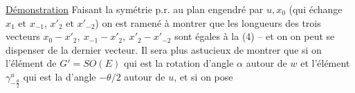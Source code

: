 \uline{Démonstration} Faisant la symétrie p.r. au plan engendré par $u,x_0$ (qui échange $x_1$ et $x_{-1}$, $x'_2$ et $x'_{-2}$) on est ramené  à montrer que les  longueurs des trois vecteurs $x_0-x'_2,\ x_{-1}-x'_2,\ x'_2-x'_{-2}$ sont égales à la (4) -- et on on peut se dispenser de la  dernier vecteur.  Il sera plus astucieux de montrer que si on   l'élément  de $G'=SO(E)$ qui est  la rotation d'angle $\alpha$ autour de $w$ et l'élément $\gamma^u_{-\frac{\theta}{2}}$ qui est la   d'angle $-\theta/2$ autour de $u$, et si on pose
